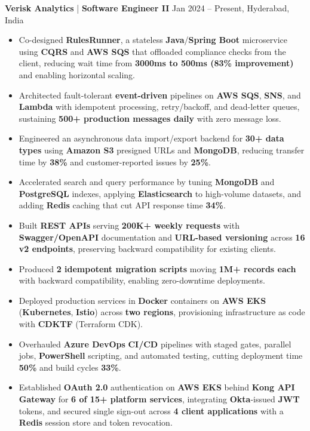 \documentclass[a4paper,10pt]{article}
\begin{document}
\textbf{Verisk Analytics} \;|\; \textbf{Software Engineer II} \hfill Jan 2024 -- Present, Hyderabad, India

\begin{itemize}[leftmargin=*]
    \item Co-designed \textbf{RulesRunner}, a stateless \textbf{Java}/\textbf{Spring Boot} microservice using \textbf{CQRS} and \textbf{AWS SQS} that offloaded compliance checks from the client, reducing wait time from \textbf{3000ms to 500ms (83\% improvement)} and enabling horizontal scaling.
    \item Architected fault-tolerant \textbf{event-driven} pipelines on \textbf{AWS SQS}, \textbf{SNS}, and \textbf{Lambda} with idempotent processing, retry/backoff, and dead-letter queues, sustaining \textbf{500+ production messages daily} with zero message loss.
    \item Engineered an asynchronous data import/export backend for \textbf{30+ data types} using \textbf{Amazon S3} presigned URLs and \textbf{MongoDB}, reducing transfer time by \textbf{38\%} and customer-reported issues by \textbf{25\%}.
    \item Accelerated search and query performance by tuning \textbf{MongoDB} and \textbf{PostgreSQL} indexes, applying \textbf{Elasticsearch} to high-volume datasets, and adding \textbf{Redis} caching that cut API response time \textbf{34\%}.
    \item Built \textbf{REST APIs} serving \textbf{200K+ weekly requests} with \textbf{Swagger/OpenAPI} documentation and \textbf{URL-based versioning} across \textbf{16 v2 endpoints}, preserving backward compatibility for existing clients.
    \item Produced \textbf{2 idempotent migration scripts} moving \textbf{1M+ records each} with backward compatibility, enabling zero-downtime deployments.
    \item Deployed production services in \textbf{Docker} containers on \textbf{AWS EKS} (\textbf{Kubernetes}, \textbf{Istio}) across \textbf{two regions}, provisioning infrastructure as code with \textbf{CDKTF} (Terraform CDK).
    \item Overhauled \textbf{Azure DevOps} \textbf{CI/CD} pipelines with staged gates, parallel jobs, \textbf{PowerShell} scripting, and automated testing, cutting deployment time \textbf{50\%} and build cycles \textbf{33\%}.
    \item Established \textbf{OAuth 2.0} authentication on \textbf{AWS EKS} behind \textbf{Kong API Gateway} for \textbf{6 of 15+ platform services}, integrating \textbf{Okta}-issued \textbf{JWT} tokens, and secured single sign-out across \textbf{4 client applications} with a \textbf{Redis} session store and token revocation.

\end{itemize}
\end{document}
